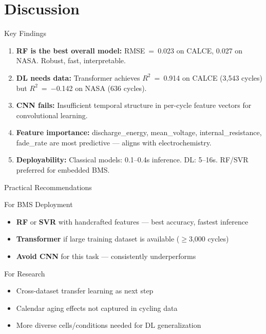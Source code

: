 \documentclass[aspectratio=169,11pt]{beamer}
\begin{document}
\section{Discussion}

\begin{frame}{Key Findings}
\begin{enumerate}[nosep]
    \item \textbf{RF is the best overall model:} RMSE~=~0.023 on CALCE, 0.027 on NASA. Robust, fast, interpretable.
    \item \textbf{DL needs data:} Transformer achieves $R^2$~=~0.914 on CALCE (3,543 cycles) but $R^2$~=~$-$0.142 on NASA (636 cycles).
    \item \textbf{CNN fails:} Insufficient temporal structure in per-cycle feature vectors for convolutional learning.
    \item \textbf{Feature importance:} discharge\_energy, mean\_voltage, internal\_resistance, fade\_rate are most predictive --- aligns with electrochemistry.
    \item \textbf{Deployability:} Classical models: 0.1--0.4s inference. DL: 5--16s. RF/SVR preferred for embedded BMS.
\end{enumerate}
\end{frame}

\begin{frame}{Practical Recommendations}
\begin{block}{For BMS Deployment}
\begin{itemize}[nosep]
    \item \textbf{RF} or \textbf{SVR} with handcrafted features --- best accuracy, fastest inference
    \item \textbf{Transformer} if large training dataset is available ($\geq$3,000 cycles)
    \item \textbf{Avoid CNN} for this task --- consistently underperforms
\end{itemize}
\end{block}
\vspace{1em}
\begin{block}{For Research}
\begin{itemize}[nosep]
    \item Cross-dataset transfer learning as next step
    \item Calendar aging effects not captured in cycling data
    \item More diverse cells/conditions needed for DL generalization
\end{itemize}
\end{block}
\end{frame}
\end{document}
